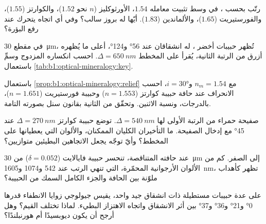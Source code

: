 \begin{exercise}[$\star$]\label{exo:b1:optical-mineralogy:4}
رتّب بحسب ، في وسط تثبيت معامله $1.54$، الأورثوكليز ($n$ نحو $1.52$)، والكوارتز ($1.55$)، والفورستيريت ($1.65$)، والألماندين ($1.83$). أيّها له بروز سالب؟ وفي أي اتجاه يتحرك  عند رفع البؤرة؟
\end{exercise}

\begin{exercise}[$\star\star$]\label{exo:b1:optical-mineralogy:5}
في مقطع \qty{30}{\micro m}، تُظهر حبيبات  أخضر ، له انشقاقان عند \ang{56} و\ang{124}، أعلى ما يُظهره أزرق من الرتبة الثانية، يُقرأ على المخطط $\Delta = \qty{650}{nm}$. احسب انكساره المزدوج وسمِّ  باستعمال \cref{tab:b1:optical-mineralogy:key}.
\end{exercise}

\begin{exercise}[$\star\star$]\label{exo:b1:optical-mineralogy:6}
باستعمال \cref{prop:b1:optical-mineralogy:relief} مع $n_m = 1.54$ و$i = \ang{30}$، احسب الانحراف عند حافة حبيبة كوارتز ($n = 1.553$) وحبيبة فورستيريت ($n = 1.651$)، بالدرجات، ونسبة الاثنين. وتحقّق من الثانية بقانون سنل بصورته التامة.
\end{exercise}

\begin{exercise}[$\star\star$]\label{exo:b1:optical-mineralogy:7}
صفيحة حمراء من الرتبة الأولى لها $\Delta = \qty{540}{nm}$. توضع حبيبة كوارتز $\Delta = \qty{270}{nm}$ عند \ang{45} مع إدخال الصفيحة. ما التأخيران الكليان الممكنان، والألوان التي يعطيانها على المخطط؟ وأيّ توجّه يجعل الاتجاهين البطيئين متوازيين؟
\end{exercise}

\begin{exercise}[$\star\star$]\label{exo:b1:optical-mineralogy:8}
عند حافته المتناقصة، تنحسر حبيبة فايالايت ($\delta = 0.052$) من \qty{30}{\micro m} إلى الصفر. كم من الألوان الأرجوانية المحمّرة، التي تنهي الرتب عند 542 و\num{1074} و\qty{1605}{nm}، تظهر كأهداب ملوّنة بين الحافة والجزء الكامل السمك من الحبيبة؟
\end{exercise}

\begin{exercise}[$\star\star$]\label{exo:b1:optical-mineralogy:9}
على عدة حبيبات مستطيلة ذات انشقاق جيد واحد، يقيس جيولوجي زوايا الانطفاء قدرها \ang{0} و\ang{21} و\ang{36} و\ang{37} بين أثر الانشقاق واتجاه الاهتزاز البطيء. لماذا تختلف القيم؟ وهل  أرجح أن يكون ديوبسيدًا أم هورنبلندًا؟
\end{exercise}

